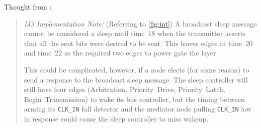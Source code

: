 
\begin{comment}
For a packaged system using \bus, simply providing an external {\tt DIN} and
{\tt DOUT} that is normally jumpered, plus access to the {\tt CLK} line, is
sufficient to allow transient bus elements (such as a programmer, debugger).

For completely contained systems, it is desirable to also define a bus
injection methodology that can be probed onto a chip, as well as a passive
listening method. \bus defines two additional, optional pads that may be added
to any node:

\begin{itemize}
  \item {\tt DSNOOP} -- Snoop, Data out
  \item {\tt MODE}   -- Connected?, Data in
\end{itemize}

The {\tt MODE} pad is connected to a weak pull-down resistor. During device
power-on, if the {\tt MODE} pad is found to be high, an external device is
assumed to be connected. In this case, the {\tt DIN} pad is routed to the {\tt
DSNOOP} pad and the {\tt MODE} pad is routed to the chip-internal {\tt DIN}
signal. Otherwise the {\tt MODE} pad is ignored and the chip {\tt DIN} pad
routes to both the chip-internal {\tt DIN} signal and the {\tt DSNOOP} pad.
These functions are determined during Power-On-Reset and remain fixed until a
future chip-Reset.
\end{comment}

Thought from :
\begin{quote}
\textit{M3 Implementation Note:} (Referring to
\cref{fig:int}) A broadcast sleep message cannot be considered a
sleep until time~18 when the transmitter asserts that all the sent bits were
desired to be sent. This leaves edges at time~20 and time~22 as the required
two edges to power gate the layer.

This could be complicated, however, if a node elects (for some reason) to send
a response to the broadcast sleep message. The sleep controller will still
have four edges (Arbitration, Priority~Drive, Priority~Latch,
Begin~Transmission) to wake its bus controller, but the timing between arming
its {\tt CLK\_IN} fall detector and the mediator node pulling {\tt CLK\_IN} low
in response could cause the sleep controller to miss wakeup.
\end{quote}
